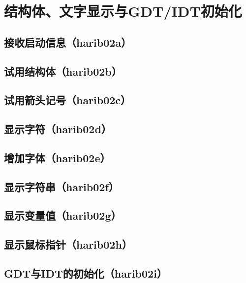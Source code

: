 ﻿\chapter{	结构体、文字显示与GDT/IDT初始化	}
\section{	接收启动信息（harib02a）	}
\section{	试用结构体（harib02b）	}
\section{	试用箭头记号（harib02c）	}
\section{	显示字符（harib02d）	}
\section{	增加字体（harib02e）	}
\section{	显示字符串（harib02f）	}
\section{	显示变量值（harib02g）	}
\section{	显示鼠标指针（harib02h）	}
\section{	GDT与IDT的初始化（harib02i）	}

